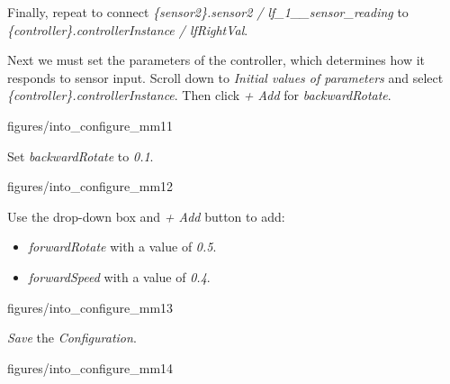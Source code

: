 \documentclass[11pt,a4paper]{../tutorial}
\begin{document}
\begin{instructions}
\item Finally, repeat to connect \emph{\{sensor2\}.sensor2 / lf\_1\_\_sensor\_reading} to \emph{\{controller\}.controllerInstance / lfRightVal}.

\item Next we must set the parameters of the controller, which determines how it responds to sensor input. Scroll down to \emph{Initial values of parameters} and select \emph{\{controller\}.controllerInstance}. Then click \emph{+ Add} for \emph{backwardRotate}.

    \begin{annotation}[width=0.8\linewidth]{figures/into_configure_mm11}
    \end{annotation}

\newpage
\item Set \emph{backwardRotate} to \emph{0.1}.

    \begin{annotation}[width=0.8\linewidth,trim=0 0 0 0,clip]{figures/into_configure_mm12}
    \end{annotation}

\item Use the drop-down box and \emph{+ Add} button to add:
    \begin{itemize}
      \item \emph{forwardRotate} with a value of \emph{0.5}.
      \item \emph{forwardSpeed} with a value of \emph{0.4}.
    \end{itemize}

    \begin{annotation}[width=0.8\linewidth,trim=0 0 0 0,clip]{figures/into_configure_mm13}
    \end{annotation}

\newpage
\item \emph{Save} the \emph{Configuration}.

    \begin{annotation}[width=0.8\linewidth,trim=0 0 0 250,clip]{figures/into_configure_mm14}
    \end{annotation}


\end{instructions}
\end{document}
